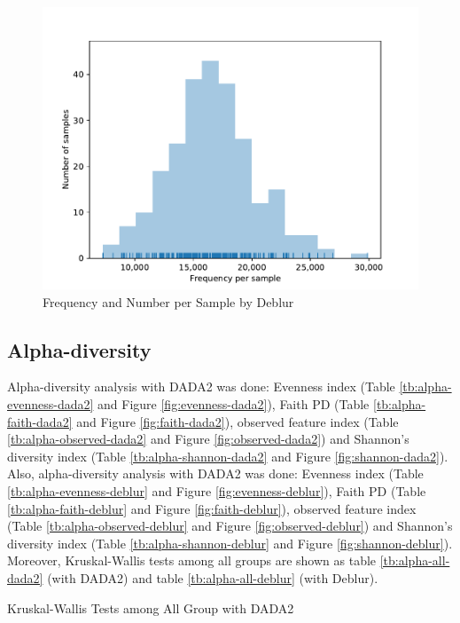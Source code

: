 \documentclass[a4paper]{article}
\begin{document}
            \begin{figure}[p]
                \centering
                \includegraphics[width=0.6 \linewidth]{figures/Rarefaction/Deblur.pdf}
                \caption{Frequency and Number per Sample by Deblur}
                \label{fig:frequency-sample-deblur}
            \end{figure}

        \subsection{Alpha-diversity}
            Alpha-diversity analysis with DADA2 was done: Evenness index (Table \ref{tb:alpha-evenness-dada2} and Figure \ref{fig:evenness-dada2}), Faith PD (Table \ref{tb:alpha-faith-dada2} and Figure \ref{fig:faith-dada2}), observed feature index (Table \ref{tb:alpha-observed-dada2} and Figure \ref{fig:observed-dada2}) and Shannon's diversity index (Table \ref{tb:alpha-shannon-dada2} and Figure \ref{fig:shannon-dada2}). Also, alpha-diversity analysis with DADA2 was done: Evenness index (Table \ref{tb:alpha-evenness-deblur} and Figure \ref{fig:evenness-deblur}), Faith PD (Table \ref{tb:alpha-faith-deblur} and Figure \ref{fig:faith-deblur}), observed feature index (Table \ref{tb:alpha-observed-deblur} and Figure \ref{fig:observed-deblur}) and Shannon's diversity index (Table \ref{tb:alpha-shannon-deblur} and Figure \ref{fig:shannon-deblur}). Moreover, Kruskal-Wallis tests among all groups are shown as table \ref{tb:alpha-all-dada2} (with DADA2) and table \ref{tb:alpha-all-deblur} (with Deblur).

            \begin{table}[p]
                \centering
                \caption{Kruskal-Wallis Tests among All Group with DADA2}
                \label{tb:alpha-all-dada2}
            \end{table}
\end{document}
